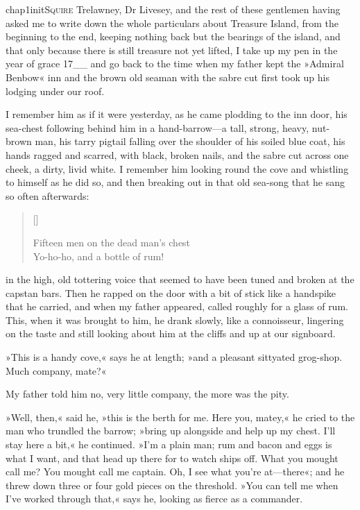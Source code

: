 

\lettrine[lines=4,image=true]{chap1initS}{quire} Trelawney, Dr Livesey, and the rest of these gentlemen having asked me to write down the whole particulars about Treasure Island, from the beginning to the end, keeping nothing back but the bearings of the island, and that only because there is still treasure not yet lifted, I take up my pen in the year of grace 17\_\_ and go back to the time when my father kept the »Admiral Benbow« inn and the brown old seaman with the sabre cut first took up his lodging under our roof.

I remember him as if it were yesterday, as he came plodding to the inn door, his sea-chest following behind him in a hand-barrow—a tall, strong, heavy, nut-brown man, his tarry pigtail falling over the shoulder of his soiled blue coat, his hands ragged and scarred, with black, broken nails, and the sabre cut across one cheek, a dirty, livid white. I remember him looking round the cove and whistling to himself as he did so, and then breaking out in that old sea-song that he sang so often afterwards:
\settowidth{\versewidth}{Fifteen men on the dead man’s chest\longdash}
\begin{verse}[\versewidth]
\begin{altverse}
Fifteen men on the dead man’s chest\longdash\\
Yo-ho-ho, and a bottle of rum!
\end{altverse}
\end{verse}

in the high, old tottering voice that seemed to have been tuned and broken at the capstan bars. Then he rapped on the door with a bit of stick like a handspike that he carried, and when my father appeared, called roughly for a glass of rum. This, when it was brought to him, he drank slowly, like a connoisseur, lingering on the taste and still looking about him at the cliffs and up at our signboard.

»This is a handy cove,« says he at length; »and a pleasant sittyated grog-shop. Much company, mate?«

My father told him no, very little company, the more was the pity.

»Well, then,« said he, »this is the berth for me. Here you, matey,« he cried to the man who trundled the barrow; »bring up alongside and help up my chest. I'll stay here a bit,« he continued. »I'm a plain man; rum and bacon and eggs is what I want, and that head up there for to watch ships off. What you mought call me? You mought call me captain. Oh, I see what you're at—there«; and he threw down three or four gold pieces on the threshold. »You can tell me when I've worked through that,« says he, looking as fierce as a commander.


